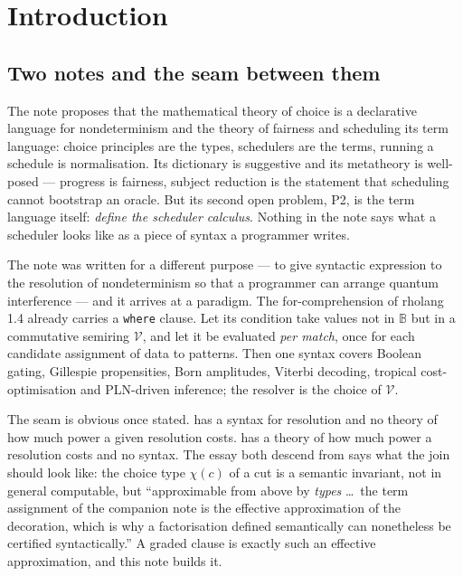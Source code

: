 \documentclass[11pt]{article}
\theoremstyle{definition}
\theoremstyle{plain}
\theoremstyle{remark}
\newcommand{\V}{\mathcal{V}}
\newcommand{\Bool}{\mathbb{B}}
\begin{document}
\section{Introduction}\label{sec:intro}

\subsection{Two notes and the seam between them}

The note \cite{choicesched} proposes that the mathematical theory of choice is a
declarative language for nondeterminism and the theory of fairness and scheduling its
term language: choice principles are the types, schedulers are the terms, running a
schedule is normalisation. Its dictionary is suggestive and its metatheory is
well-posed --- progress is fairness, subject reduction is the statement that scheduling
cannot bootstrap an oracle. But its second open problem, P2, is the term language
itself: \emph{define the scheduler calculus}. Nothing in the note says what a scheduler
looks like as a piece of syntax a programmer writes.

The note \cite{gradedwhere} was written for a different purpose --- to give syntactic
expression to the resolution of nondeterminism so that a programmer can arrange
quantum interference --- and it arrives at a paradigm. The for-comprehension of rholang
1.4 already carries a \texttt{where} clause. Let its condition take values not in
$\Bool$ but in a commutative semiring $\V$, and let it be evaluated \emph{per match},
once for each candidate assignment of data to patterns. Then one syntax covers
Boolean gating, Gillespie propensities, Born amplitudes, Viterbi decoding, tropical
cost-optimisation and PLN-driven inference; the resolver is the choice of $\V$.

The seam is obvious once stated. \cite{gradedwhere} has a syntax for resolution and no
theory of how much power a given resolution costs. \cite{choicesched} has a theory of
how much power a resolution costs and no syntax. The essay both descend from
\cite{agency} says what the join should look like: the choice type $\chi(c)$ of a cut
is a semantic invariant, not in general computable, but ``approximable from above by
\emph{types} \dots\ the term assignment of the companion note is the effective
approximation of the decoration, which is why a factorisation defined semantically can
nonetheless be certified syntactically.'' A graded clause is exactly such an effective
approximation, and this note builds it.
\end{document}
